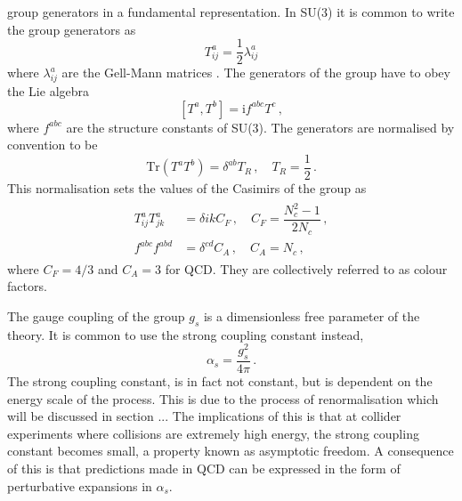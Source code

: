 \documentclass[main.tex]{subfiles}
\begin{document}
    group generators in a fundamental representation. In SU(3) it is
    common to write the group generators as
    \begin{equation}\label{eqn:group_generators}
        T^{a}_{ij} = \dfrac{1}{2}\lambda^{a}_{ij}
    \end{equation}
    where $\lambda^{a}_{ij}$ are the Gell-Mann matrices \cite{Gell-Mann:1962yej}.
    The generators of the group have to obey the Lie algebra
    \begin{equation}\label{eqn:lie_algebra}
        [T^{a}, T^{b}] = \mathrm{i}f^{abc}T^{c} \, ,
    \end{equation}
    where $f^{abc}$ are the structure constants of SU(3).
    The generators are normalised by convention to be
    \begin{equation}\label{eqn:generator_normalisation}
        \mathrm{Tr}(T^{a}T^{b}) = \delta^{ab}T_{R} \, , \quad T_{R} = \dfrac{1}{2} \, .
    \end{equation}
    This normalisation sets the values of the Casimirs
    of the group as
    \begin{align}\label{eqn:casimirs}
        \begin{split}
            T^{a}_{ij}T^{a}_{jk} &= \delta{ik}C_{F} \, , \quad C_{F} = \dfrac{N_{c}^2-1}{2N_{c}} \, , \\
            f^{abc}f^{abd} &= \delta^{cd}C_{A} \, , \quad C_{A} = N_{c} \, ,
        \end{split}
    \end{align}
    where $C_{F}=4/3$ and $C_{A}=3$ for QCD.
    They are collectively referred to as colour factors.

    The gauge coupling of the group $g_{s}$
    is a dimensionless free parameter of the theory.
    It is common to use the strong coupling constant
    instead, 
    \begin{equation}\label{eqn:alpha_s}
        \alpha_{s} = \dfrac{g_{s}^{2}}{4\pi} \, .
    \end{equation}
    The strong coupling constant, is in fact not constant, but
    is dependent on the energy scale of the process. This
    is due to the process of renormalisation which will be discussed
    in section ...
    The implications of this is that at collider
    experiments where collisions are extremely high energy,
    the strong coupling constant becomes small, a
    property known as asymptotic freedom. A consequence
    of this is that predictions made in QCD can be expressed
    in the form of perturbative expansions in $\alpha_{s}$.
\end{document}
